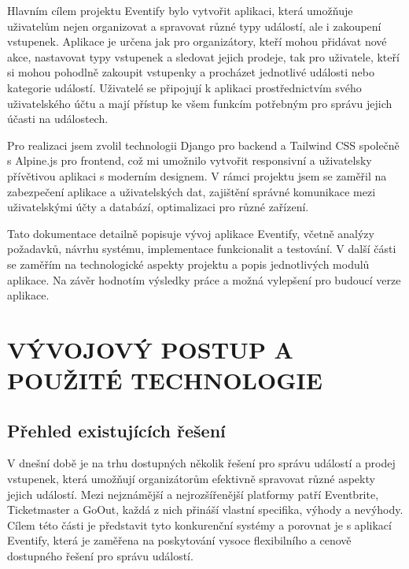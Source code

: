 \documentclass[12pt, a4paper,
twoside,        %
openright
]{report}
\begin{document}
Hlavním cílem projektu Eventify bylo vytvořit aplikaci, která umožňuje uživatelům nejen organizovat a spravovat různé typy událostí, ale i zakoupení vstupenek. Aplikace je určena jak pro organizátory, kteří mohou přidávat nové akce, nastavovat typy vstupenek a sledovat jejich prodeje, tak pro uživatele, kteří si mohou pohodlně zakoupit vstupenky a procházet jednotlivé události nebo kategorie událostí. Uživatelé se připojují k aplikaci prostřednictvím svého uživatelského účtu a mají přístup ke všem funkcím potřebným pro správu jejich účasti na událostech.

Pro realizaci jsem zvolil technologii Django pro backend a Tailwind CSS společně s \linebreak Alpine.js pro frontend, což mi umožnilo vytvořit responsivní a uživatelsky přívětivou aplikaci s moderním designem. V rámci projektu jsem se zaměřil na zabezpečení aplikace a uživatelských dat, zajištění správné komunikace mezi uživatelskými účty a databází, optimalizaci pro různé zařízení.

Tato dokumentace detailně popisuje vývoj aplikace Eventify, včetně analýzy požadavků, návrhu systému, implementace funkcionalit a testování. V další části se zaměřím na technologické aspekty projektu a popis jednotlivých modulů aplikace. Na závěr hodnotím výsledky práce a možná vylepšení pro budoucí verze aplikace.
\pagestyle{empty}
\clearpage


\chapter{VÝVOJOVÝ POSTUP A POUŽITÉ TECHNOLOGIE }

\section{Přehled existujících řešení }

V dnešní době je na trhu dostupných několik řešení pro správu událostí a prodej vstupenek, která umožňují organizátorům efektivně spravovat různé aspekty jejich událostí. Mezi nejznámější a nejrozšířenější platformy patří Eventbrite, Ticketmaster a GoOut, každá z nich přináší vlastní specifika, výhody a nevýhody. Cílem této části je představit tyto konkurenční systémy a porovnat je s aplikací Eventify, která je zaměřena na poskytování vysoce flexibilního a cenově dostupného řešení pro správu událostí.
\end{document}
